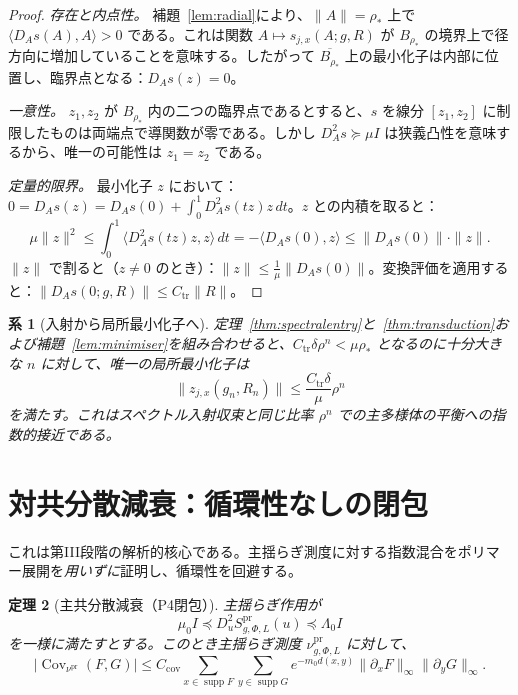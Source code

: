 \documentclass[12pt]{article}
\theoremstyle{plain}
\newtheorem{theorem}{定理}[section]
\newtheorem{corollary}[theorem]{系}
\theoremstyle{definition}
\numberwithin{equation}{section}
\newcommand{\Cov}{\operatorname{Cov}}
\newcommand{\supp}{\operatorname{supp}}
\newcommand{\pr}{\mathrm{pr}}
\newcommand{\tr}{\mathrm{tr}}
\begin{document}
\begin{proof}
\emph{存在と内点性。}
補題~\ref{lem:radial}により、$\|A\|=\rho_*$ 上で $\langle D_A s(A),A\rangle>0$ である。これは関数 $A\mapsto s_{j,x}(A;g,R)$ が $B_{\rho_*}$ の境界上で径方向に増加していることを意味する。したがって $\overline{B_{\rho_*}}$ 上の最小化子は内部に位置し、臨界点となる：$D_A s(z)=0$。

\emph{一意性。}
$z_1,z_2$ が $B_{\rho_*}$ 内の二つの臨界点であるとすると、$s$ を線分 $[z_1,z_2]$ に制限したものは両端点で導関数が零である。しかし $D_A^2 s\succeq\mu I$ は狭義凸性を意味するから、唯一の可能性は $z_1=z_2$ である。

\emph{定量的限界。}
最小化子 $z$ において：$0=D_A s(z)=D_A s(0)+\int_0^1 D_A^2 s(tz)z\,dt$。$z$ との内積を取ると：
\begin{equation}
\mu\|z\|^2 \leq \int_0^1\langle D_A^2 s(tz)z,z\rangle\,dt = -\langle D_A s(0),z\rangle \leq \|D_A s(0)\|\cdot\|z\|.
\end{equation}
$\|z\|$ で割ると（$z\neq 0$ のとき）：$\|z\|\leq\frac{1}{\mu}\|D_A s(0)\|$。変換評価を適用すると：$\|D_A s(0;g,R)\|\leq C_{\tr}\|R\|$。
\end{proof}

\begin{corollary}[入射から局所最小化子へ]\label{cor:entry}
定理~\ref{thm:spectralentry}と~\ref{thm:transduction}および補題~\ref{lem:minimiser}を組み合わせると、$C_{\tr}\delta\rho^n<\mu\rho_*$ となるのに十分大きな $n$ に対して、唯一の局所最小化子は
\begin{equation}
\|z_{j,x}(g_n,R_n)\| \leq \frac{C_{\tr}\delta}{\mu}\rho^n
\end{equation}
を満たす。これはスペクトル入射収束と同じ比率 $\rho^n$ での\emph{主多様体の平衡への指数的接近}である。
\end{corollary}

\section{対共分散減衰：循環性なしの閉包}\label{sec:P4}

これは第III段階の解析的核心である。主揺らぎ測度に対する指数混合をポリマー展開を\emph{用いずに}証明し、循環性を回避する。

\begin{theorem}[主共分散減衰（P4閉包）]\label{thm:P4}
主揺らぎ作用が
\begin{equation}
\mu_0 I \preceq D_u^2 S^{\pr}_{g,\Phi,L}(u) \preceq \Lambda_0 I
\end{equation}
を一様に満たすとする。このとき主揺らぎ測度 $\nu^{\pr}_{g,\Phi,L}$ に対して、
\begin{equation}
\boxed{|\Cov_{\nu^{\pr}}(F,G)| \leq C_{\mathrm{cov}}\sum_{x\in\supp F}\sum_{y\in\supp G}e^{-m_0 d(x,y)}\|\partial_x F\|_\infty\|\partial_y G\|_\infty.}
\end{equation}
\end{theorem}
\end{document}
